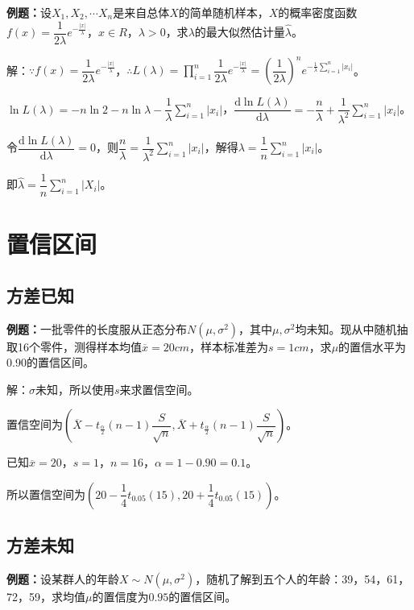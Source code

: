 \documentclass[UTF8, 12pt]{ctexart}
\begin{document}
\textbf{例题：}设$X_1,X_2,\cdots X_n$是来自总体$X$的简单随机样本，$X$的概率密度函数$f(x)=\dfrac{1}{2\lambda}e^{-\frac{\vert x\vert}{\lambda}}$，$x\in R$，$\lambda>0$，求$\lambda$的最大似然估计量$\hat{\lambda}$。

解：$\because f(x)=\dfrac{1}{2\lambda}e^{-\frac{\vert x\vert}{\lambda}}$，$\therefore L(\lambda)=\prod\limits_{i=1}^n\dfrac{1}{2\lambda}e^{-\frac{\vert x\vert}{\lambda}}=\left(\dfrac{1}{2\lambda}\right)^ne^{-\frac{1}{\lambda}\sum\limits_{i=1}^n\vert x_i\vert}$。

$\ln L(\lambda)=-n\ln2-n\ln\lambda-\dfrac{1}{\lambda}\sum\limits_{i=1}^n\vert x_i\vert$，$\dfrac{\textrm{d}\ln L(\lambda)}{\textrm{d}\lambda}=-\dfrac{n}{\lambda}+\dfrac{1}{\lambda^2}\sum\limits_{i=1}^n\vert x_i\vert$。

令$\dfrac{\textrm{d}\ln L(\lambda)}{\textrm{d}\lambda}=0$，则$\dfrac{n}{\lambda}=\dfrac{1}{\lambda^2}\sum\limits_{i=1}^n\vert x_i\vert$，解得$\lambda=\dfrac{1}{n}\sum\limits_{i=1}^n\vert x_i\vert$。

即$\hat{\lambda}=\dfrac{1}{n}\sum\limits_{i=1}^n\vert X_i\vert$。

\section{置信区间}

\subsection{方差已知}

\textbf{例题：}一批零件的长度服从正态分布$N(\mu,\sigma^2)$，其中$\mu,\sigma^2$均未知。现从中随机抽取16个零件，测得样本均值$\overline{x}=20cm$，样本标准差为$s=1cm$，求$\mu$的置信水平为0.90的置信区间。

解：$\sigma$未知，所以使用$s$来求置信空间。

置信空间为$(\overline{X}-t_\frac{\alpha}{2}(n-1)\dfrac{S}{\sqrt{n}},\overline{X}+t_\frac{\alpha}{2}(n-1)\dfrac{S}{\sqrt{n}})$。

已知$\overline{x}=20$，$s=1$，$n=16$，$\alpha=1-0.90=0.1$。

所以置信空间为$\left(20-\dfrac{1}{4}t_{0.05}(15),20+\dfrac{1}{4}t_{0.05}(15)\right)$。

\subsection{方差未知}

\textbf{例题：}设某群人的年龄$X\sim N(\mu,\sigma^2)$，随机了解到五个人的年龄：39，54，61，72，59，求均值$\mu$的置信度为$0.95$的置信区间。
\end{document}
